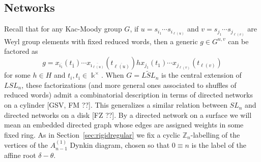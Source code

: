 \documentclass[12pt]{amsart}
\newcommand{\ZZ}{\mathbb{Z}}
\newcommand{\kk}{\Bbbk}
\newcommand{\ol}[1]{\overline{#1}}
\theoremstyle{remark}
\numberwithin{equation}{section}
\numberwithin{figure}{section}
\begin{document}
\subsection{Networks}\label{sec:networks}
Recall that for any Kac-Moody group $G$, if $u=s_{i_1}\cdots s_{i_{\ell(u)}}$ and $v=s_{j_1}\cdots s_{j_{\ell(v)}}$ are Weyl group elements with fixed reduced words, then a generic $g \in G^{u,v}$ can be factored as
\begin{equation}
  \label{eq:uvfactorization}
  g = x_{\ol{\imath_1}}(t_{\ol{1}})\cdots x_{\ol{\imath_{\ell(u)}}}(t_{\ol{\ell(u)}})hx_{j_1}(t_{1}) \cdots x_{j_{\ell(v)}}(t_{\ell(v)})
\end{equation}
for some $h \in H$ and $t_i,t_{\ol{\imath}} \in \kk^\times$.
When $G = \widetilde{LSL}_n$ is the central extension of $LSL_n$, these factorizations (and more general ones associated to shuffles of reduced words) admit a combinatorial description in terms of directed networks on a cylinder [GSV, FM ??].
This generalizes a similar relation between $SL_n$ and directed networks on a disk [FZ ??].
By a directed network on a surface we will mean an embedded directed graph whose edges are assigned weights in some fixed ring.
As in Section~\ref{sec:rigidregular} we fix a cyclic $\ZZ_n$-labelling of the vertices of the $A_{n-1}^{\!(1)}$ Dynkin diagram, chosen so that $0 \equiv n$ is the label of the affine root $\delta - \theta$.
\end{document}
